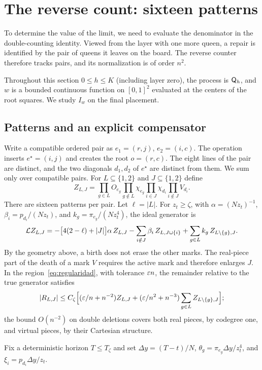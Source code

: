 \section{The reverse count: sixteen patterns}\label{sec:inversa}

To determine the value of the limit, we need to evaluate the denominator in the double-counting identity.
Viewed from the layer with
one more queen, a repair is identified by the pair of queens it leaves on the board. The reverse counter
therefore tracks pairs, and
its normalization is of order $n^2$.

Throughout this section $0\le h\le K$ (including layer zero), the process is $\mathsf{Q}_h$, and $w$ is a bounded
continuous function on
$[0,1]^2$ evaluated at the centers of the root squares. We study $I_w$ on the final placement.

\subsection{Patterns and an explicit compensator}

Write a compatible ordered pair as $e_1=(r,j)$, $e_2=(i,c)$. The operation inserts $e^\star=(i,j)$ and
creates the root $o=(r,c)$. The
eight lines of the pair are distinct, and the two diagonals $d_1,d_2$ of $e^\star$ are distinct from them.
We sum only over compatible
pairs. For $L\subseteq\{1,2\}$ and $J\subseteq\{1,2\}$ define \[
 Z_{L,J}=\prod_{g\in L}O_{e_g}\prod_{g\notin L}\chi_{e_g}\prod_{i\in J}\chi_{d_i}\prod_{i\notin J}V_{d_i}.
\] There are sixteen patterns per pair. Let $\ell=|L|$. For $z_t\ge\zeta$, with $\alpha=(Nz_t)^{-1}$,
$\beta_i=p_{d_i}/(Nz_t)$, and
$k_g=\pi_{e_g}/(Nz_t^4)$, the ideal generator is \[
 \mathcal{L} Z_{L,J}=-\bigl[4(2-\ell)+|J|\bigr]\alpha\,Z_{L,J}-\sum_{i\notin J}\beta_i\,Z_{L,J\cup\{i\}}
 +\sum_{g\in L}k_g\,Z_{L\setminus\{g\},J}.
\] By the geometry above, a birth does not erase the other marks. The real-piece part of the death of a mark
$V$ requires the active mark and
therefore enlarges $J$. In the region~\eqref{eq:regularidad}, with tolerance $\varepsilon n$, the remainder
relative to the true generator
satisfies \[
 |R_{L,J}|\le C_\zeta\Bigl[(\varepsilon/n+n^{-2})Z_{L,J}+(\varepsilon/n^2+n^{-3})\sum_{g\in L}Z_{L\setminus\{g\},J}\Bigr];
\] the bound $O(n^{-2})$ on double deletions covers both real pieces, by codegree one, and virtual pieces,
by their Cartesian structure.

Fix a deterministic horizon $T\le T_\zeta$ and set $\Delta y=(T-t)/N$, $\theta_g=\pi_{e_g}\Delta y/z_t^4$,
and $\xi_i=p_{d_i}\Delta y/z_t$.

